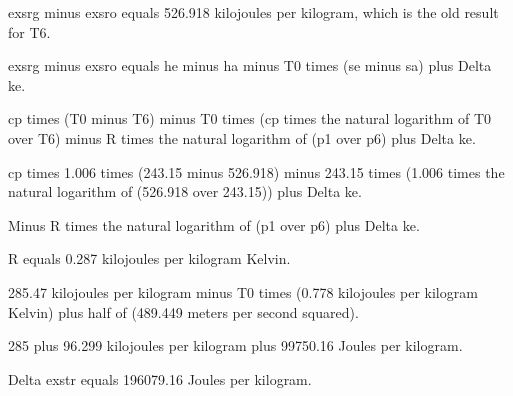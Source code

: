exsrg minus exsro equals 526.918 kilojoules per kilogram, which is the old result for T6.

exsrg minus exsro equals he minus ha minus T0 times (se minus sa) plus Delta ke.

cp times (T0 minus T6) minus T0 times (cp times the natural logarithm of T0 over T6) minus R times the natural logarithm of (p1 over p6) plus Delta ke.

cp times 1.006 times (243.15 minus 526.918) minus 243.15 times (1.006 times the natural logarithm of (526.918 over 243.15)) plus Delta ke.

Minus R times the natural logarithm of (p1 over p6) plus Delta ke.

R equals 0.287 kilojoules per kilogram Kelvin.

285.47 kilojoules per kilogram minus T0 times (0.778 kilojoules per kilogram Kelvin) plus half of (489.449 meters per second squared).

285 plus 96.299 kilojoules per kilogram plus 99750.16 Joules per kilogram.

Delta exstr equals 196079.16 Joules per kilogram.